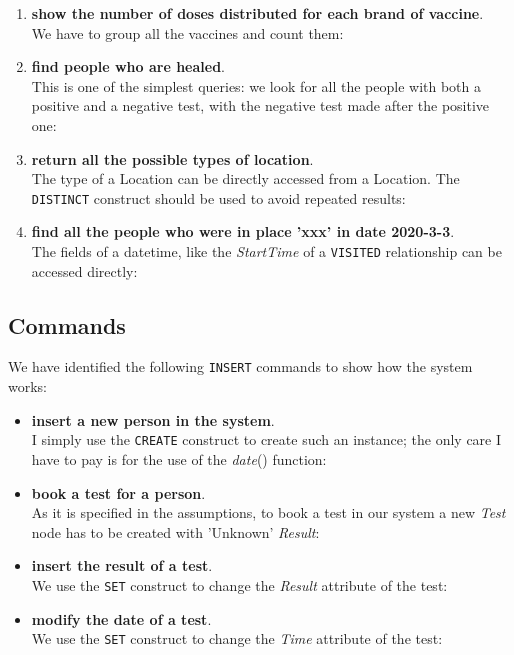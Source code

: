 \documentclass{article}
\begin{document}
\begin{enumerate}
    
    \item \textbf{show the number of doses distributed for each brand of vaccine}.\\ We have to group all the vaccines and count them:
    
    \item \textbf{find people who are healed}. \\This is one of the simplest queries: we look for all the people with both a positive and a negative test, with the negative test made after the positive one:
    
    \item \textbf{return all the possible types of location}. \\The type of a Location can be directly accessed from a Location. The \verb|DISTINCT| construct should be used to avoid repeated results:
    
    \item \textbf{find all the people who were in place 'xxx' in date 2020-3-3}. \\The fields of a datetime, like the \textit{StartTime} of a \verb|VISITED| relationship can be accessed directly:
    
\end{enumerate}
\subsection{Commands}
We have identified the following \verb |INSERT| commands to show how the system works:
\begin{itemize}
    \item \textbf{insert a new person in the system}. \\I simply use the \verb|CREATE| construct to create such an instance; the only care I have to pay is for the use of the \textit{date}() function:
    
    \item \textbf{book a test for a person}.\\As it is specified in the assumptions, to book a test in our system a new \textit{Test} node has to be created with 'Unknown' \textit{Result}:
    
    \item \textbf{insert the result of a test}. \\We use the \verb|SET| construct to change the \textit{Result} attribute of the test:
    
    \item \textbf{modify the date of a test}. \\We use the \verb|SET| construct to change the \textit{Time} attribute of the test:
    
\end{itemize}
\end{document}
